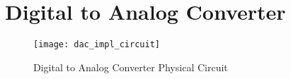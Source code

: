 \graphicspath{{content/4_implementation/figures/}}
\section{Digital to Analog Converter}

\begin{figure}[!htb]
  \centering
  \texttt{[image: dac\_impl\_circuit]}
  \caption{Digital to Analog Converter Physical Circuit}
\end{figure}